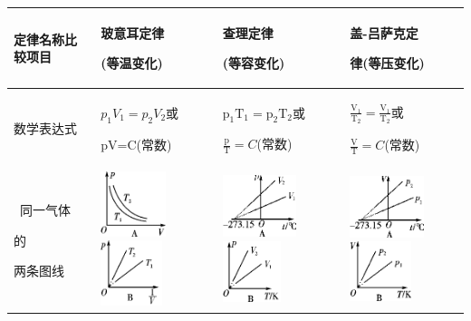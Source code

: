 \begin{longtable}[]{@{}m{3cm}m{3cm}m{3cm}m{3cm}@{}}
\toprule
定律名称比较项目
&
玻意耳定律

(等温变化)
&
查理定律

(等容变化)
&
盖-吕萨克定

律(等压变化)
\tabularnewline
\midrule
\endhead
数学表达式
&
$p_1V_1=p_2V_2$或

pV=C(常数)
&
$\mathrm{p}_{1} \mathrm{T}_{1}=\mathrm{p}_{2} \mathrm{T}_{2}$或

$\frac{\mathrm{p}}{\mathrm{T}}=C$(常数)
&
$\frac{\mathrm{V}_{1}}{\mathrm{T}_{2}}=\frac{\mathrm{V}_{1}}{\mathrm{T}_{2}}$或

$\frac{ \mathrm{V}}{\mathrm{T}}=C$(常数)
\tabularnewline\
同一气体

的

两条图线
&
\includegraphics[width=0.74514in,height=0.74514in]{media/image495.png}
\includegraphics[width=0.70764in,height=0.74514in]{media/image496.png}
&
\includegraphics[width=0.84931in,height=0.70764in]{media/image497.png}
\includegraphics[width=0.67014in,height=0.69792in]{media/image498.png}
&
\includegraphics[width=0.84931in,height=0.70764in]{media/image499.png}
\includegraphics[width=0.70764in,height=0.68889in]{media/image500.png}
\tabularnewline
\bottomrule
\end{longtable}
\newpage
